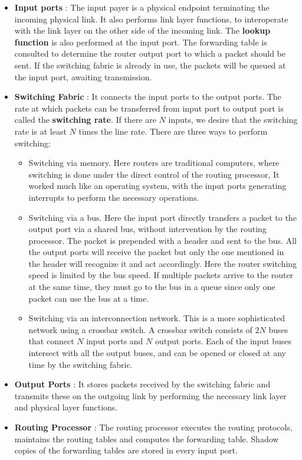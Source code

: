 \documentclass[12pt,letterpaper]{book}
\theoremstyle{definition}
\begin{document}
\begin{itemize}
  \item \textbf{Input ports} : The input payer is a physical endpoint terminating the incoming physical link. It also performs link layer functions, to interoperate with the link layer on the other side of the incoming link. The \textbf{lookup function}  is also performed at the input port. The forwarding table is consulted to determine the router output port to which a packet should be sent. If the switching fabric is already in use, the packets will be queued at the input port, awaiting transmission.
  \item \textbf{Switching Fabric} : It connects the input ports to the output ports. The rate at which packets can be transferred from input port to output port is called the \textbf{switching rate}. If there are $N$ inputs, we desire that the switching rate is at least $N$ times the line rate. There are three ways to perform switching:
    \begin{itemize}
      \item Switching via memory. Here routers are traditional computers, where switching is done under the direct control of the routing processor, It worked much like an operating system, with the input ports generating interrupts to perform the necessary operations.
      \item Switching via a bus. Here the input port directly transfers a packet to the output port via a shared bus, without intervention by the routing processor. The packet is prepended with a header and sent to the bus. All the output ports will receive the packet but only the one mentioned in the header will recognize it and act accordingly. Here the router switching speed is limited by the bus speed. If multiple packets arrive to the router at the same time, they must go to the bus in a queue since only one packet can use the bus at a time.
      \item Switching via an interconnection network. This is a more sophisticated network using a crossbar switch. A crossbar switch consists of $2N$ buses that connect $N$ input ports and $N$ output ports. Each of the input buses intersect with all the output buses, and can be opened or closed at any time by the switching fabric.
    \end{itemize}
  \item \textbf{Output Ports} : It stores packets received by the switching fabric and transmits these on the outgoing link by performing the necessary link layer and physical layer functions.
  \item \textbf{Routing Processor}  : The routing processor executes the routing protocols, maintains the routing tables and computes the forwarding table. Shadow copies of the forwarding tables are stored in every input port.
\end{itemize}
\end{document}
